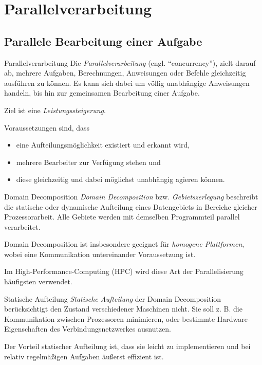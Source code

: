 \section{Parallelverarbeitung}\label{sec:parallelverarbeitung}

\subsection{Parallele Bearbeitung einer Aufgabe}

\begin{defi}{Parallelverarbeitung}
    Die \emph{Parallelverarbeitung} (engl. \enquote{concurrency}), zielt darauf ab, mehrere Aufgaben, Berechnungen, Anweisungen oder Befehle gleichzeitig ausführen zu können.
    Es kann sich dabei um völlig unabhängige Anweisungen handeln, bis hin zur gemeinsamen Bearbeitung einer Aufgabe.
    
    Ziel ist eine \emph{Leistungssteigerung}.
    
    Voraussetzungen sind, dass
    \begin{itemize}
        \item eine Aufteilungsmöglichkeit existiert und erkannt wird,
        \item mehrere Bearbeiter zur Verfügung stehen und
        \item diese gleichzeitig und dabei möglichst unabhängig agieren können.
    \end{itemize}
\end{defi}

\begin{defi}{Domain Decomposition}
    \emph{Domain Decomposition} bzw. \emph{Gebietszerlegung} beschreibt die statische oder dynamische Aufteilung eines Datengebiets in Bereiche gleicher Prozessorarbeit.
    Alle Gebiete werden mit demselben Programmteil parallel verarbeitet.
    
    Domain Decomposition ist insbesondere geeignet für \emph{homogene Plattformen}, 
    wobei eine Kommunikation untereinander Voraussetzung ist.
    
    Im High-Performance-Computing (HPC) wird diese Art der Parallelisierung häufigsten verwendet.
\end{defi}

\begin{defi}{Statische Aufteilung}
    \emph{Statische Aufteilung} der Domain Decomposition berücksichtigt den Zustand verschiedener Maschinen nicht.
    Sie soll z. B. die Kommunikation zwischen Prozessoren minimieren, oder bestimmte Hardware-Eigenschaften des Verbindungsnetzwerkes ausnutzen.
    
    Der Vorteil statischer Aufteilung ist, dass sie leicht zu implementieren und bei relativ regelmäßigen Aufgaben äußerst effizient ist.
\end{defi}

